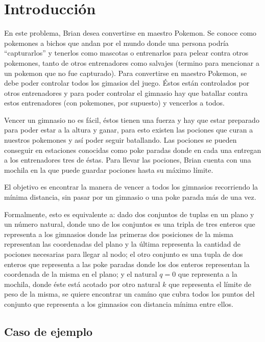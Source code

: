 \section{Introducción}

En este problema, Brian desea convertirse en maestro Pokemon. Se conoce como pokemones a bichos que andan por el mundo donde una persona podría ``capturarlos'' y tenerlos como mascotas o entrenarlos para pelear contra otros pokemones, tanto de otros entrenadores como salvajes (termino para mencionar a un pokemon que no fue capturado). Para convertirse en maestro Pokemon, se debe poder controlar todos los gimasios del juego. Éstos están controlados por otros entrenadores y para poder controlar el gimnasio hay que batallar contra estos entrenadores (con pokemones, por supuesto) y vencerlos a todos. 

Vencer un gimnasio no es fácil, éstos tienen una fuerza y hay que estar preparado para poder estar a la altura y ganar, para esto existen las pociones que curan a nuestros pokemones y así poder seguir batallando. Las pociones se pueden conseguir en estaciones conocidas como poke paradas donde en cada una entregan a los entrenadores tres de éstas. Para llevar las pociones, Brian cuenta con una mochila en la que puede guardar pociones hasta su máximo límite.

El objetivo es encontrar la manera de vencer a todos los gimnasios recorriendo la mínima distancia, sin pasar por un gimnasio o una poke parada más de una vez.

Formalmente, esto es equivalente a: dado dos conjuntos de tuplas en un plano y un número natural, donde uno de los conjuntos es una tripla de tres enteros que representa a los gimnasios donde las primeras dos posiciones de la misma representan las coordenadas del plano y la última representa la cantidad de pociones necesarias para llegar al nodo; el otro conjunto es una tupla de dos enteros que representa a las poke paradas donde los dos enteros representan la coordenada de la misma en el plano; y el natural $q = 0$ que representa a la mochila, donde éste está acotado por otro natural $k$ que representa el límite de peso de la misma, se quiere encontrar un camíno que cubra todos los puntos del conjunto que representa a los gimnasios con distancia mínima entre ellos.


\subsection{Caso de ejemplo}

